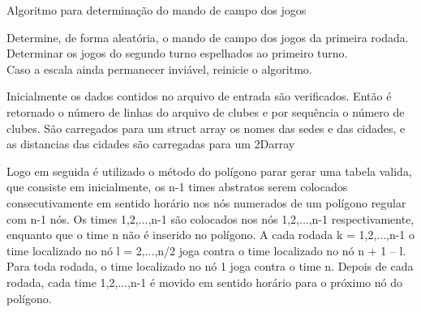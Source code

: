 \documentclass[12pt,a4paper]{article}
\makeatletter
\newcommand{\algorithmfootnote}[2][\footnotesize]{%
	\let\old@algocf@finish\@algocf@finish%
	\def\@algocf@finish{\old@algocf@finish%
		\leavevmode\rlap{\begin{minipage}{\linewidth}
				#1#2
		\end{minipage}}%
	}%
}
\makeatother
\begin{document}
\begin{algorithm}
	\caption{Algoritmo para determinação do mando de campo dos jogos}
	\algorithmfootnote{Fonte: \Citeauthor{marcio:jogos} \Citep{marcio:jogos}}
	\label{mando}
	Determine, de forma aleatória, o mando de campo dos jogos da primeira rodada.\\
	Determinar os jogos do segundo turno espelhados ao primeiro turno.\\
	Caso a escala ainda permanecer inviável, reinicie o algoritmo.
\end{algorithm}

Inicialmente os dados contidos no arquivo de entrada são verificados. Então é retornado o número de linhas do arquivo de clubes e por sequência o número de clubes. São carregados para um struct array os nomes das sedes e das cidades, e as distancias das cidades são carregadas para um 2Darray

Logo em seguida é utilizado o método do polígono parar gerar uma tabela valida, que consiste em inicialmente, os n-1 times abstratos serem colocados consecutivamente em sentido horário nos nós numerados de um polígono regular com n-1 nós. Os times 1,2,...,n-1 são colocados nos nós 1,2,...,n-1 respectivamente, enquanto que o time n não é inserido no polígono. A cada rodada k = 1,2,...,n-1 o time localizado no nó l = 2,...,n/2 joga contra o time localizado no nó n + 1 – l. Para toda rodada, o time localizado no nó 1 joga contra o time n. Depois de cada rodada, cada time 1,2,...,n-1 é movido em sentido horário para o próximo nó do polígono.
\end{document}
